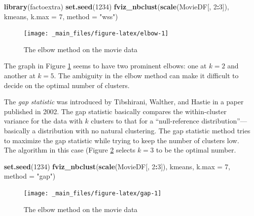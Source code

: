 \documentclass[
]{book}
\newenvironment{Shaded}{\begin{snugshade}}{\end{snugshade}}
\newcommand{\AttributeTok}[1]{\textcolor[rgb]{0.13,0.29,0.53}{#1}}
\newcommand{\DecValTok}[1]{\textcolor[rgb]{0.00,0.00,0.81}{#1}}
\newcommand{\FunctionTok}[1]{\textcolor[rgb]{0.13,0.29,0.53}{\textbf{#1}}}
\newcommand{\NormalTok}[1]{#1}
\newcommand{\SpecialCharTok}[1]{\textcolor[rgb]{0.81,0.36,0.00}{\textbf{#1}}}
\newcommand{\StringTok}[1]{\textcolor[rgb]{0.31,0.60,0.02}{#1}}
\theoremstyle{definition}
\theoremstyle{definition}
\theoremstyle{definition}
\theoremstyle{definition}
\theoremstyle{remark}
\begin{document}
\begin{Shaded}
\begin{Highlighting}[]
\FunctionTok{library}\NormalTok{(factoextra)}
\FunctionTok{set.seed}\NormalTok{(}\DecValTok{1234}\NormalTok{)}
\FunctionTok{fviz\_nbclust}\NormalTok{(}\FunctionTok{scale}\NormalTok{(MovieDF[, }\DecValTok{2}\SpecialCharTok{:}\DecValTok{3}\NormalTok{]), kmeans, }\AttributeTok{k.max =} \DecValTok{7}\NormalTok{,  }
                \AttributeTok{method =} \StringTok{"wss"}\NormalTok{)}
\end{Highlighting}
\end{Shaded}

\begin{figure}

{\centering \texttt{[image: \_main\_files/figure-latex/elbow-1]} 

}

\caption{The elbow method on the movie data}\label{fig:elbow}
\end{figure}

The graph in Figure \ref{fig:elbow} seems to have two prominent elbows: one at \(k=2\) and another at \(k=5.\) The ambiguity in the elbow method can make it difficult to decide on the optimal number of clusters.

The \emph{gap statistic} was introduced by Tibshirani, Walther, and Hastie in a paper published in 2002\autocite{gap}. The gap statistic basically compares the within-cluster variance for the data with \(k\) clusters to that for a ``null-reference distribution''---basically a distribution with no natural clustering. The gap statistic method tries to maximize the gap statistic while trying to keep the number of clusters low. The algorithm in this case (Figure \ref{fig:gap} selects \(k=3\) to be the optimal number.

\begin{Shaded}
\begin{Highlighting}[]
\FunctionTok{set.seed}\NormalTok{(}\DecValTok{1234}\NormalTok{)}
\FunctionTok{fviz\_nbclust}\NormalTok{(}\FunctionTok{scale}\NormalTok{(MovieDF[, }\DecValTok{2}\SpecialCharTok{:}\DecValTok{3}\NormalTok{]), kmeans, }\AttributeTok{k.max =} \DecValTok{7}\NormalTok{,  }
                \AttributeTok{method =} \StringTok{"gap"}\NormalTok{)}
\end{Highlighting}
\end{Shaded}

\begin{figure}

{\centering \texttt{[image: \_main\_files/figure-latex/gap-1]} 

}

\caption{The elbow method on the movie data}\label{fig:gap}
\end{figure}
\end{document}
